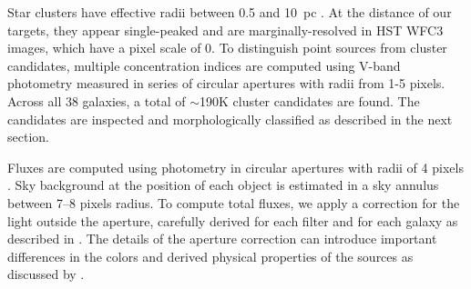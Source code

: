 \documentclass[linenumbers]{aastex63}
\begin{document}
Star clusters have effective radii between 0.5 and 10~pc \citep{portegies_zwart_young_2010,ryon_effective_2017,krumholz_star_2019,brown_radii_2021}. At the distance of our targets, they appear single-peaked and are marginally-resolved in HST WFC3 images, which have a pixel scale of 0.  To distinguish point sources from cluster candidates, multiple concentration indices \citep[MCI, ][]{thilker_phangs-hst_2022} are computed using V-band photometry measured in series of circular apertures with radii from 1-5 pixels.  Across all 38 galaxies, a total of $\sim$190K cluster candidates are found.  The candidates are inspected and morphologically classified as described in the next section.  

Fluxes are computed using photometry in circular apertures with radii of 4 pixels \citep[$\sim$ 0; which subtends 3.4 to 18 pc for galaxy distances 5 to 23 Mpc spanned by the PHANGS-HST sample, see][Table 1]{lee_phangs-hst_2022}. Sky background at the position of each object is estimated in a sky annulus between 7--8 pixels radius. To compute total fluxes, we apply a correction for the light outside the aperture, carefully derived for each filter and for each galaxy as described in \cite{deger_bright_2022}.  The details of the aperture correction can introduce important differences in the colors and derived physical properties of the sources as discussed by \cite{deger_bright_2022}.
\end{document}
